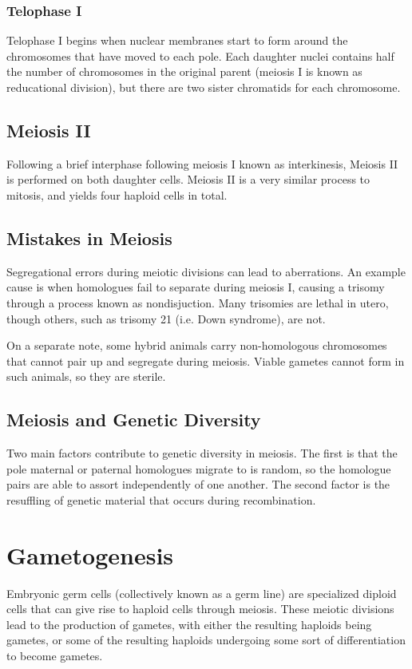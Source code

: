 \documentclass[12pt,titlepage]{article}
\begin{document}
      \subsubsection{Telophase I}
        Telophase I begins when nuclear membranes start to form around the chromosomes that have moved to each pole. Each daughter nuclei contains half the number of chromosomes
        in the original parent (meiosis I is known as reducational division), but there are two sister chromatids for each chromosome.

    \subsection{Meiosis II}
      Following a brief interphase following meiosis I known as interkinesis, Meiosis II is performed on both daughter cells. Meiosis II is a very similar process to mitosis,
      and yields four haploid cells in total.

    \subsection{Mistakes in Meiosis}
      Segregational errors during meiotic divisions can lead to aberrations. An example cause is when homologues fail to separate during meiosis I, causing a trisomy through
      a process known as nondisjuction. Many trisomies are lethal in utero, though others, such as trisomy 21 (i.e. Down syndrome), are not.

      On a separate note, some hybrid animals carry non-homologous chromosomes that cannot pair up and segregate during meiosis. Viable gametes cannot form in such animals,
      so they are sterile.

    \subsection{Meiosis and Genetic Diversity}
      Two main factors contribute to genetic diversity in meiosis. The first is that the pole maternal or paternal homologues migrate to is random, so the homologue pairs
      are able to assort independently of one another. The second factor is the resuffling of genetic material that occurs during recombination.

  \newpage

  \section{Gametogenesis}
    Embryonic germ cells (collectively known as a germ line) are specialized diploid cells that can give rise to haploid cells through meiosis. These meiotic divisions lead
    to the production of gametes, with either the resulting haploids being gametes, or some of the resulting haploids undergoing some sort of differentiation to become
    gametes.
\end{document}
